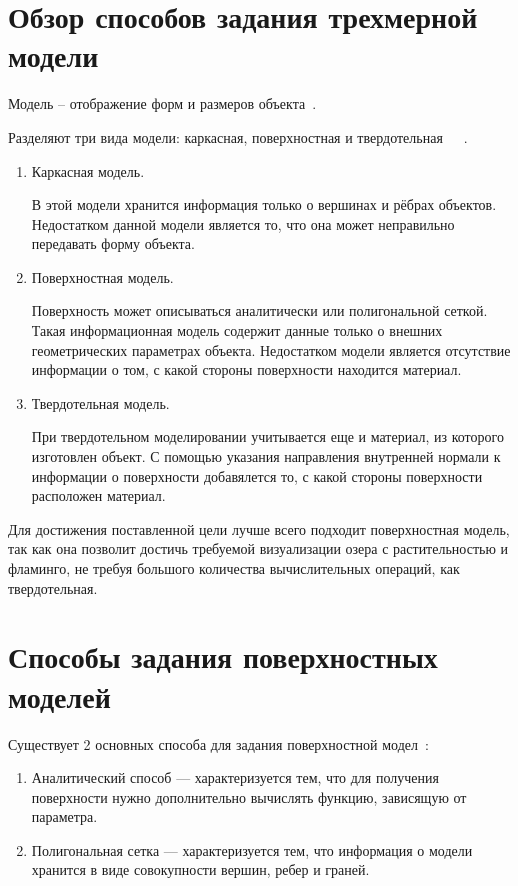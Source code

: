 \section[Обзор способов задания трехмерной модели]{Обзор способов задания трехмерной\\модели}

Модель – отображение форм и размеров объекта~\cite{kurov}.

Разделяют три вида модели: каркасная, поверхностная и твердотельная~\cite{kurov}~\cite{roders}~\cite{refl}.
\begin{enumerate}[label=\arabic*)]
	\item Каркасная модель. 
	
	В этой модели хранится информация только о вершинах и рёбрах объектов. Недостатком данной модели является то, что она может неправильно передавать форму объекта.
	\item Поверхностная модель.
	
	Поверхность может описываться аналитически или полигональной сеткой. Такая информационная модель содержит данные только о внешних геометрических параметрах объекта. Недостатком модели является отсутствие информации о том, с какой стороны поверхности находится материал.

	\item Твердотельная модель.
	
	При твердотельном моделировании учитывается еще и материал, из которого изготовлен объект.  С помощью указания направления внутренней нормали к информации о поверхности добавялется то, с какой стороны поверхности расположен материал.
\end{enumerate}

Для достижения поставленной цели лучше всего подходит поверхностная модель, так как она позволит достичь требуемой визуализации озера с растительностью и фламинго, не требуя большого количества вычислительных операций, как твердотельная. 

\section[Способы задания поверхностных моделей]{Способы задания поверхностных\\моделей}

Существует 2 основных способа для задания поверхностной модел~\cite{roders}:
\begin{enumerate}[label=\arabic*)]
	\item Аналитический способ --- характеризуется тем, что для получения поверхности нужно дополнительно вычислять функцию, зависящую от параметра.
	
	\item Полигональная сетка --- характеризуется тем, что информация о модели хранится в виде совокупности вершин, ребер и граней.
\end{enumerate}

